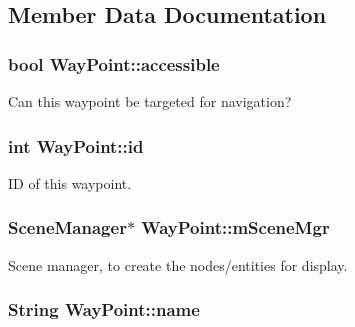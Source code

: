 \subsection{\-Member \-Data \-Documentation}
\hypertarget{classWayPoint_aae4377ca4bb86993f6572403e1d7e71c}{
\subsubsection[{accessible}]{\setlength{\rightskip}{0pt plus 5cm}bool {\bf \-Way\-Point\-::accessible}}}\label{classWayPoint_aae4377ca4bb86993f6572403e1d7e71c}
\-Can this waypoint be targeted for navigation? \hypertarget{classWayPoint_a01b5cf642bf27270f3eb44adfe7de271}{
\subsubsection[{id}]{\setlength{\rightskip}{0pt plus 5cm}int {\bf \-Way\-Point\-::id}}}\label{classWayPoint_a01b5cf642bf27270f3eb44adfe7de271}
\-I\-D of this waypoint. \hypertarget{classWayPoint_a8a18ed96355454b4f1713d196aff2216}{
\subsubsection[{m\-Scene\-Mgr}]{\setlength{\rightskip}{0pt plus 5cm}\-Scene\-Manager$\ast$ {\bf \-Way\-Point\-::m\-Scene\-Mgr}}}\label{classWayPoint_a8a18ed96355454b4f1713d196aff2216}
\-Scene manager, to create the nodes/entities for display. \hypertarget{classWayPoint_aca34a5b321d0f27d810a3097c3ef0f3a}{
\subsubsection[{name}]{\setlength{\rightskip}{0pt plus 5cm}\-String {\bf \-Way\-Point\-::name}}}\label{classWayPoint_aca34a5b321d0f27d810a3097c3ef0f3a}
